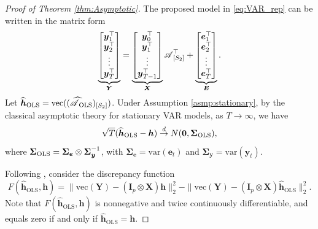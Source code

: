 \documentclass[12pt]{article}
\newcommand{\bm}{\boldsymbol}
\newcommand{\cm}[1]{\mbox{\boldmath$\mathscr{#1}$}}
\begin{document}
\begin{proof}[Proof of Theorem \ref{thm:Asymptotic}]
	The proposed model in \eqref{eq:VAR_rep} can be written in the matrix form
	\begin{equation}
	\underbrace{\begin{bmatrix}\bm{y}_1^\top\\\bm{y}_2^\top\\\vdots\\\bm{y}_T^\top\end{bmatrix}}_{\bm{Y}}=\underbrace{\begin{bmatrix}\bm{y}_0^\top\\\bm{y}_1^\top\\\vdots\\\bm{y}_{T-1}^\top\end{bmatrix}}_{\bm{X}}\cm{A}_{[S_2]}^\top
	+\underbrace{\begin{bmatrix}\bm{e}_1^\top\\\bm{e}_2^\top\\\vdots\\\bm{e}_T^\top\end{bmatrix}}_{\bm{E}}.
	\end{equation}
	Let $\bm{\widehat{h}}_{\text{OLS}}=\text{vec}((\cm{\widehat{A}}_{\textup{OLS}})_{[S_2]})$. Under Assumption \ref{asmp:stationary}, by the classical asymptotic theory for stationary VAR models, as $T\to\infty$, we have
	\begin{equation}
	\sqrt{T}(\bm{\widehat{h}}_{\text{OLS}}-\bm{h})\overset{d}{\to}N(\bm{0},\bm{\Sigma}_{\textup{OLS}}),
	\end{equation}
	where $\bm{\Sigma}_{\textup{OLS}}=\bm{\Sigma}_{\bm{e}}\otimes\bm{\Sigma}_{\bm{y}}^{-1}$, with $\bm{\Sigma}_{\bm{e}}=\text{var}(\bm{e}_t)$ and $\bm{\Sigma}_{\bm{y}}=\text{var}(\bm{y}_t)$.
	
	Following \cite{shapiro1986asymptotic}, consider the discrepancy function
	\begin{equation}
	F(\bm{\widehat{h}}_{\text{OLS}},\bm{h})=\|\text{vec}(\bm{Y})-(\bm{I}_p\otimes\bm{X})\bm{h}\|_2^2-\|\text{vec}(\bm{Y})-(\bm{I}_p\otimes\bm{X})\bm{\widehat{h}}_{\text{OLS}}\|_2^2.
	\end{equation}
	Note that $F(\bm{\widehat{h}}_{\text{OLS}},\bm{h})$ is nonnegative and twice continuously differentiable, and equals zero if and only if $\bm{\widehat{h}}_{\text{OLS}}=\bm{h}$. 
	

\end{proof}
\end{document}
